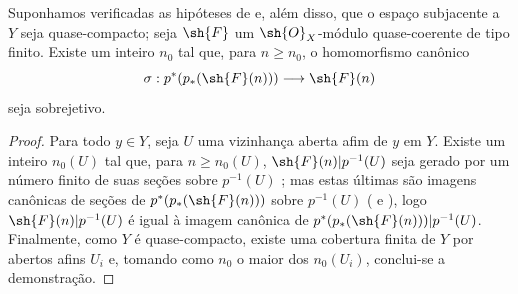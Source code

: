 \documentclass[oneside,10pt]{amsart}
\makeatletter
\renewcommand{\geq}{\geqslant}
\newcommand{\ega@arrow}[2]{\mathchoice{#1}{#2}{#2}{#2}}
\renewcommand{\to}{\ega@arrow{\longrightarrow}{\rightarrow}}
\let\EGAOriginalLabel\label
\renewcommand{\label}[1]{\phantomsection\EGAOriginalLabel{#1}}
\makeatother
\begin{document}
\begin{corollary}[3.4.6]
\label{II.3.4.6}
Suponhamos verificadas as hipóteses de  e, além disso, que o espaço subjacente a $Y$ seja quase-compacto;
seja $\sh{F}$ um $\sh{O}_X$-módulo quase-coerente de tipo finito.
Existe um inteiro $n_0$ tal que, para $n\geq n_0$, o homomorfismo canônico
\[
  \sigma:p^*(p_*(\sh{F}(n)))\to\sh{F}(n)
\]
 seja sobrejetivo.
\end{corollary}

\begin{proof}
Para todo $y\in Y$, seja $U$ uma vizinhança aberta afim de $y$ em $Y$.
Existe um inteiro $n_0(U)$ tal que, para $n\geq n_0(U)$, $\sh{F}(n)|p^{-1}(U)$ seja gerado por um número finito de suas seções sobre $p^{-1}(U)$ ;
mas estas últimas são imagens canônicas de seções de $p^*(p_*(\sh{F}(n)))$ sobre $p^{-1}(U)$ ( e ), logo $\sh{F}(n)|p^{-1}(U)$ é igual à imagem canônica de $p^*(p_*(\sh{F}(n)))|p^{-1}(U)$.
Finalmente, como $Y$ é quase-compacto, existe uma cobertura finita de $Y$ por abertos afins $U_i$ e, tomando como $n_0$ o maior dos $n_0(U_i)$, conclui-se a demonstração.
\end{proof}
\end{document}
